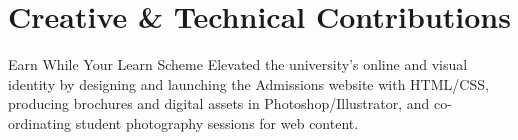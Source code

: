 \vspace{-1em}
\section{Creative \& Technical Contributions}
\begin{sectionContainer}
	{Earn While Your Learn Scheme} {Elevated the university's online and visual identity by designing and launching the Admissions website with HTML/CSS, producing brochures and digital assets in Photoshop/Illustrator, and co-ordinating student photography sessions for web content.}
\end{sectionContainer}


\nopagebreak[4]